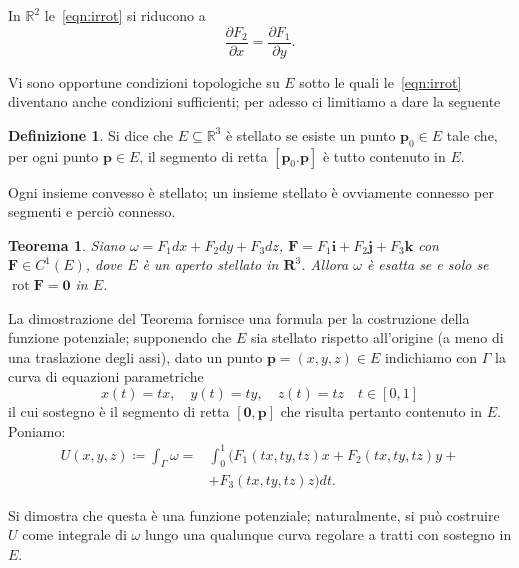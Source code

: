\documentclass[a4paper]{book}
\DeclareMathOperator{\rot}{rot}
\numberwithin{equation}{section}
\theoremstyle{plain}
\newtheorem{teor}{Teorema}[section]
\theoremstyle{definition}
\newtheorem{defn}{Definizione}[section]
\theoremstyle{remark}
\renewcommand{\vec}{\boldsymbol}
\theoremstyle{example}
\begin{document}
In $\mathbb{R}^2$ le~\eqref{eqn:irrot} si riducono a
\begin{equation}
	\frac{\partial F_2}{\partial x} = \frac{\partial F_1}{\partial y}.
\end{equation}

Vi sono opportune condizioni topologiche su $E$ sotto le quali le~\eqref{eqn:irrot} diventano anche condizioni sufficienti; per adesso ci limitiamo a dare la seguente
\begin{defn}
	Si dice che $E \subseteq \mathbb{R}^3$ è stellato se esiste un punto $\vec{p}_0 \in E$ tale che, per ogni punto $\vec{p} \in E$, il segmento di retta $[\vec{p}_0. \vec{p}]$ è tutto contenuto in $E$.
\end{defn}

Ogni insieme convesso è stellato; un insieme stellato è ovviamente connesso per segmenti e perciò connesso.

\begin{teor}
	Siano $\omega = F_1dx + F_2 dy + F_3 dz$, $\vec{F} = F_1\vec{i} + F_2\vec{j} + F_3\vec{k}$ con $\vec{F} \in C^1(E)$, dove $E$ è un aperto stellato in $\vec{R}^3$. Allora $\omega$ è esatta se e solo se $\rot{\vec{F}} = \vec{0}$ in $E$.
\end{teor}

La dimostrazione del Teorema fornisce una formula per la costruzione della funzione potenziale; supponendo che $E$ sia stellato rispetto all'origine (a meno di una traslazione degli assi), dato un punto $\vec{p} = (x, y, z) \in E$ indichiamo con $\Gamma$ la curva di equazioni parametriche
\begin{equation*}
	x(t) = tx, \quad y(t) = ty, \quad z(t) = tz \quad t \in [0, 1]
\end{equation*}
il cui sostegno è il segmento di retta $[\vec{0}, \vec{p}]$ che risulta pertanto contenuto in $E$. Poniamo:
\begin{equation}
	\begin{split}
		U(x, y, z) \coloneqq \int_{\Gamma}\omega = &\int_0^1 (F_1(tx, ty, tz)x + F_2(tx, ty, tz)y + \\ &+ F_3(tx, ty, tz)z) dt.
	\end{split}
\end{equation}

Si dimostra che questa è una funzione potenziale; naturalmente, si può costruire $U$ come integrale di $\omega$ lungo una qualunque curva regolare a tratti con sostegno in $E$.
\end{document}
